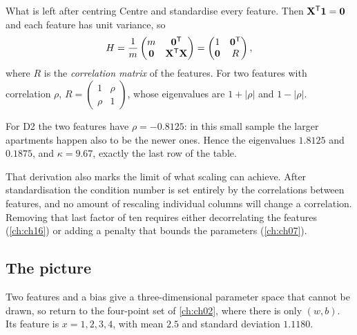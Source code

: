 \begin{derivation}{What is left after centring}
Centre and standardise every feature. Then $\mathbf{X}^{\mathsf{T}}\mathbf{1} =
\mathbf{0}$ and each feature has unit variance, so
\[
  H = \frac1m \begin{pmatrix} m & \mathbf{0}^{\mathsf{T}}\\
                              \mathbf{0} & \mathbf{X}^{\mathsf{T}}\mathbf{X}\end{pmatrix}
    = \begin{pmatrix} 1 & \mathbf{0}^{\mathsf{T}}\\
                      \mathbf{0} & R\end{pmatrix},
\]
where $R$ is the \emph{correlation matrix} of the features. For two features
with correlation $\rho$, $R = \left(\begin{smallmatrix}1&\rho\\ \rho&1
\end{smallmatrix}\right)$, whose eigenvalues are $1+|\rho|$ and $1-|\rho|$.

For D2 the two features have $\rho = -0.8125$: in this small sample the larger
apartments happen also to be the newer ones. Hence the eigenvalues $1.8125$ and
$0.1875$, and $\kappa = 9.67$, exactly the last row of the table.
\end{derivation}

That derivation also marks the limit of what scaling can achieve. After
standardisation the condition number is set entirely by the correlations between
features, and no amount of rescaling individual columns will change a
correlation. Removing that last factor of ten requires either decorrelating the
features (\cref{ch:ch16}) or adding a penalty that bounds the parameters
(\cref{ch:ch07}).

\subsection{The picture}

Two features and a bias give a three-dimensional parameter space that cannot be
drawn, so return to the four-point set of \cref{ch:ch02}, where there is only
$(w,b)$. Its feature is $x = 1,2,3,4$, with mean $2.5$ and standard deviation
$1.1180$.

